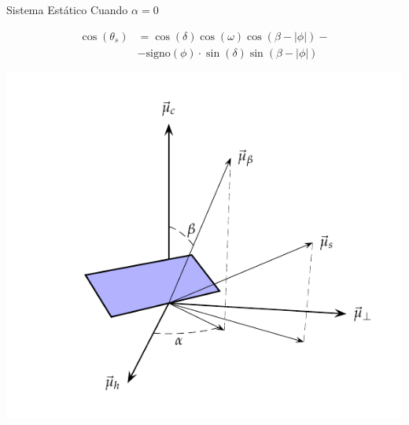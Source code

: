 \documentclass[xcolor={usenames,svgnames,dvipsnames}]{beamer}
\begin{document}
\begin{frame}[label={sec:orgef183ee}]{Sistema Estático}
Cuando \(\alpha=0\)

\begin{align*}
\cos(\theta_{s}) &= \cos\left(\delta\right)\cos\left(\omega\right)\cos\left(\beta-|\phi|\right)-\\ 
&- \mathrm{signo}(\phi)\cdot\sin(\delta)\sin\left(\beta-|\phi|\right)
\end{align*}


\begin{center}
\includegraphics[height=0.6\textheight]{../figs/AngulosSistemaEstatico.pdf}
\end{center}
\end{frame}
\end{document}
